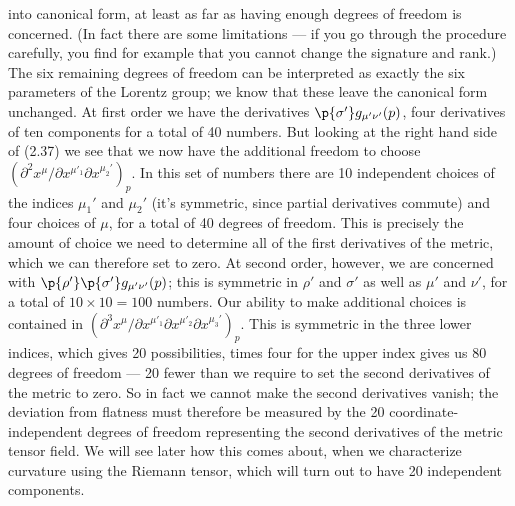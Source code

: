 into canonical form, at least as far as having enough degrees of
freedom is concerned.  (In fact there are some limitations --- if you go
through the procedure carefully, you find for example that you cannot
change the signature and rank.)  The six remaining degrees of freedom can
be interpreted as exactly the six parameters of the Lorentz group;
we know that these leave the canonical form unchanged.  At first
order we have the derivatives $\p{\sigma'}g_{\mu'\nu'}(p)$, four
derivatives of ten components for a total of 40 numbers.  But looking
at the right hand side of (2.37) we see that we now have the additional
freedom to choose $(\partial^2 x^\mu/\partial x^{\mu'_1}
\partial x^{\mu_2'})_p$.  In this set of numbers there are 10 
independent choices of the indices $\mu_1'$ and $\mu_2'$ (it's symmetric, 
since partial derivatives commute) and four choices of $\mu$, for
a total of 40 degrees of freedom.  This is precisely the amount of
choice we need to determine all of the first derivatives of the metric,
which we can therefore set to zero.  At second order, however, we are
concerned with $\p{\rho'}\p{\sigma'}g_{\mu'\nu'}(p)$; this is symmetric
in $\rho'$ and $\sigma'$ as well as $\mu'$ and $\nu'$, for a total of
$10\times 10=100$ numbers.  Our ability to make additional choices
is contained in $(\partial^3 x^\mu/\partial x^{\mu'_1}\partial x^{\mu'_2}
\partial x^{\mu_3'})_p$.  This is symmetric in the three lower indices,
which gives 20 possibilities, times four for the upper index gives us
80 degrees of freedom --- 20 fewer than we require to set the second
derivatives of the metric to zero.  So in fact we cannot make the second
derivatives vanish; the deviation from flatness must therefore be
measured by the 20 coordinate-independent degrees of freedom representing
the second derivatives of the 
metric tensor field.  We will see later how this comes about, when we
characterize curvature using the Riemann tensor, which will turn out
to have 20 independent components.

